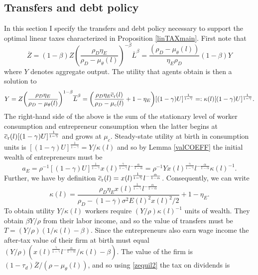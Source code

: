 \documentclass[11pt]{article}
\theoremstyle{plain}
\begin{document}
\subsection{Transfers and debt policy} \label{debt_pol}

In this section I specify the transfers and debt policy necessary to support the optimal linear taxes characterized in Proposition \ref{linTAXmain}. First note that
\begin{equation}
\overline{Z} = (1-\beta)Z{\left(\frac{\rho_D\eta_E}{\rho_D - \mu_{\theta}(l)} \right)}^{-\beta}\overline{L}^{\beta} = \frac{(\rho_D - \mu_{\theta}(l))}{\eta_E \rho_D}(1-\beta)Y
\label{zequil2}
\end{equation}
where $Y$ denotes aggregate output. The utility that agents obtain is then a solution to
$$ 
Y = Z{\left(\frac{\rho_D\eta_E}{\rho_D - \mu_{\theta}(l)} \right)}^{1-\beta}\overline{L}^{\beta} = {\left(\frac{\rho_D \eta_E\overline{c}_{\textnormal{r}}(l)}{\rho_D - \mu_c(l)} + 1 - \eta_E\right)}[(1-\gamma)U]^{\frac{1}{1-\overline{\gamma}}} =: \kappa(l)[(1-\gamma)U]^{\frac{1}{1-\overline{\gamma}}}.
$$
The right-hand side of the above is the sum of the stationary level of worker consumption and entrepreneur consumption when the latter begins at $\overline{c}_{\textnormal{r}}(l)[(1-\gamma)U]^{\frac{1}{1-\overline{\gamma}}}$ and grows at $\mu_c$. Steady-state utility at birth in consumption units is $[(1-\gamma)U]^{\frac{1}{1-\overline{\gamma}}} = Y/\kappa(l)$ and so by Lemma \ref{valCOEFF} the initial wealth of entrepreneurs must be 
$$
a_E = \rho^{-1} [(1-\gamma)U]^{\frac{1}{1-\overline{\gamma}}}x(l)^{\frac{\overline{\gamma}}{1-\overline{\gamma}}}l^{-\frac{\alpha}{1-\alpha}} = \rho^{-1}Yx(l)^{\frac{\overline{\gamma}}{1-\overline{\gamma}}}l^{-\frac{\alpha}{1-\alpha}}  \kappa(l)^{-1}.
$$
Further, we have by definition $\overline{c}_{\textnormal{r}}(l) = x(l)^{\frac{1}{1-\overline{\gamma}}}l^{-\frac{\alpha}{1-\alpha}}$. Consequently, we can write 
\begin{equation}
\kappa(l) = \frac{\rho_D \eta_E x(l)^{\frac{1}{1-\overline{\gamma}}}l^{-\frac{\alpha}{1-\alpha}}}{\rho_D - (1-\overline{\gamma})\sigma^2 E(l)^2 x(l)^2/2} + 1 - \eta_E.
\label{kappa}
\end{equation}
To obtain utility $Y/\kappa(l)$ workers require $(Y/\rho)\kappa(l)^{-1}$ units of wealth. They obtain $\beta Y/\rho$ from their labor income, and so the value of transfers must be $T = (Y/\rho)(1/\kappa(l) - \beta)$. Since the entrepreneurs also earn wage income the after-tax value of their firm at birth must equal $(Y/\rho){\left(x(l)^{\frac{\overline{\gamma}}{1-\overline{\gamma}}}l^{-\frac{\alpha}{1-\alpha}}/\kappa(l) - \beta\right)}$. The value of the firm is $(1-\tau_d)\overline{Z}/(\rho - \mu_{\theta}(l))$, and so using \eqref{zequil2} the tax on dividends is
\end{document}
